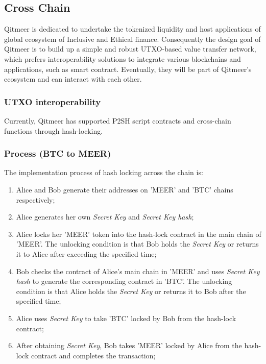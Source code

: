 \documentclass[a4paper,11pt]{article}
\begin{document}
\subsection{Cross Chain}
Qitmeer is dedicated to undertake the tokenized liquidity and host applications of global ecosystem of Inclusive and Ethical finance. Consequently the design goal of Qitmeer is to build up a simple and robust UTXO-based value transfer network, which prefers interoperability solutions to integrate various blockchains and applications, such as smart contract. Eventually, they will be part of Qitmeer’s ecosystem and can interact with each other.

\subsubsection{UTXO interoperability}
Currently, Qitmeer has supported P2SH script contracts and cross-chain functions through hash-locking.

\subsubsection*{Process (BTC to MEER)}

The implementation process of hash locking across the chain is:

\begin{enumerate}
\item  Alice and Bob generate their addresses on 'MEER' and 'BTC' chains respectively;

\item Alice generates her own \textit{Secret Key} and \textit{Secret Key hash};

\item Alice locks her 'MEER' token into the hash-lock contract in the main chain of 'MEER'. The unlocking condition is that Bob holds the \textit{Secret Key} or returns it to Alice after exceeding the specified time;

\item Bob checks the contract of Alice's main chain in 'MEER' and uses \textit{Secret Key hash}   to generate the corresponding contract in 'BTC'. The unlocking condition is that Alice holds the \textit{Secret Key} or returns it to Bob after the specified time;

\item Alice uses \textit{Secret Key}  to take  'BTC' locked by Bob from the hash-lock contract;

\item After obtaining \textit{Secret Key}, Bob  takes 'MEER' locked by Alice from the hash-lock contract and completes the transaction;

\end{enumerate}
\end{document}
